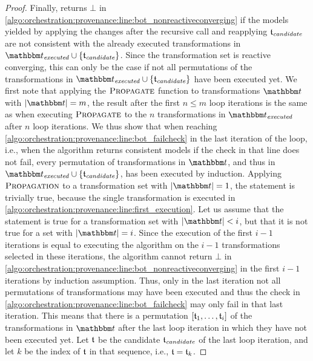 \begin{proof}
    Finally,  returns $\bot$ in \autoref{algo:orchestration:provenance:line:bot_nonreactiveconverging} if the models yielded by applying the changes after the recursive call and reapplying $\provalgcandidate$ are not consistent with the already executed transformations in $\provalgexecuted \cup \setted{\provalgcandidate}$.
    Since the transformation set is reactive converging, this can only be the case if not all permutations of the transformations in $\provalgexecuted \cup 
    \setted{\provalgcandidate}$ have been executed yet.
    We first note that applying the $\textsc{Propagate}$ function to transformations $\transformationset{t}$ with $\abs{\transformationset{t}} = m$, the result after the first $n \leq m$ loop iterations is the same as when executing $\textsc{Propagate}$ to the $n$ transformations in $\provalgexecuted$ after $n$ loop iterations.
    We thus show that when reaching \autoref{algo:orchestration:provenance:line:bot_failcheck} in the last iteration of the loop, i.e., when the algorithm returns consistent models if the check in that line does not fail, every permutation of transformations in $\transformationset{t}$, and thus in $\provalgexecuted \cup \setted{\provalgcandidate}$, has been executed by induction.
    Applying $\textsc{Propagation}$ to a transformation set with $\abs{\transformationset{t}} = 1$, the statement is trivially true, because the single transformation is executed in \autoref{algo:orchestration:provenance:line:first_execution}.
    Let us assume that the statement is true for a transformation set with $\abs{\transformationset{t}} < i$, but that it is not true for a set with $\abs{\transformationset{t}} = i$.
    Since the execution of the first $i-1$ iterations is equal to executing the algorithm on the $i-1$ transformations selected in these iterations, the algorithm cannot return $\bot$ in \autoref{algo:orchestration:provenance:line:bot_nonreactiveconverging} in the first $i-1$ iterations by induction assumption.
    Thus, only in the last iteration not all permutations of transformations may have been executed and thus the check in \autoref{algo:orchestration:provenance:line:bot_failcheck} may only fail in that last iteration.
    This means that there is a permutation $\sequenced{\transformation{t}_{1}, \dots, \transformation{t}_{i}}$ of the transformations in $\transformationset{t}$ after the last loop iteration in which they have not been executed yet.
    Let $\transformation{t}$ be the candidate $\provalgcandidate$ of the last loop iteration, and let $k$ be the index of $\transformation{t}$ in that sequence, i.e., $\transformation{t} = \transformation{t}_{k}$.

\end{proof}
